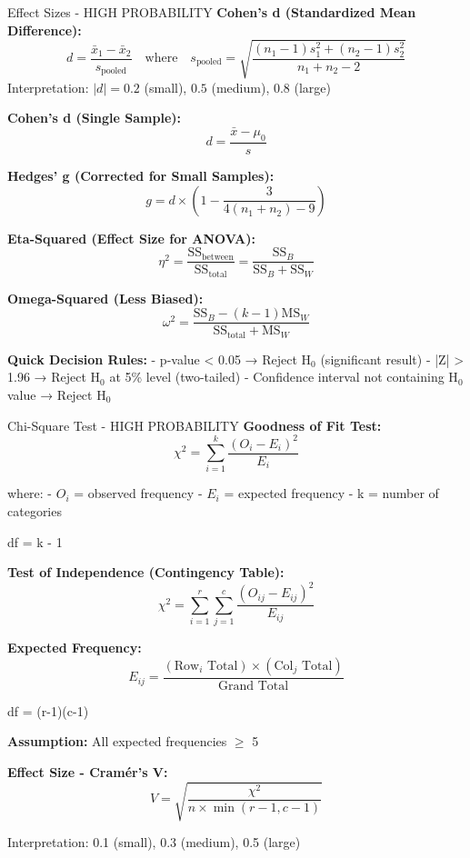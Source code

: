 \documentclass[11pt]{article}
\begin{document}
\begin{important}{Effect Sizes - HIGH PROBABILITY}
\textbf{Cohen's d (Standardized Mean Difference):}
\[d = \frac{\bar{x}_1 - \bar{x}_2}{s_{\text{pooled}}} \quad \text{where} \quad s_{\text{pooled}} = \sqrt{\frac{(n_1-1)s_1^2 + (n_2-1)s_2^2}{n_1+n_2-2}}\]
Interpretation: $|d| = 0.2$ (small), $0.5$ (medium), $0.8$ (large)

\textbf{Cohen's d (Single Sample):}
\[d = \frac{\bar{x} - \mu_0}{s}\]

\textbf{Hedges' g (Corrected for Small Samples):}
\[g = d \times \left(1 - \frac{3}{4(n_1 + n_2) - 9}\right)\]

\textbf{Eta-Squared (Effect Size for ANOVA):}
\[\eta^2 = \frac{\text{SS}_{\text{between}}}{\text{SS}_{\text{total}}} = \frac{\text{SS}_B}{\text{SS}_B + \text{SS}_W}\]

\textbf{Omega-Squared (Less Biased):}
\[\omega^2 = \frac{\text{SS}_B - (k-1)\text{MS}_W}{\text{SS}_{\text{total}} + \text{MS}_W}\]
\end{important}

\begin{example}
\textbf{Quick Decision Rules:}
- p-value < 0.05 → Reject H$_0$ (significant result)
- |Z| > 1.96 → Reject H$_0$ at 5\% level (two-tailed)
- Confidence interval not containing H$_0$ value → Reject H$_0$
\end{example}

\begin{important}{Chi-Square Test - HIGH PROBABILITY}
\textbf{Goodness of Fit Test:}
\[\chi^2 = \sum_{i=1}^{k}\frac{(O_i - E_{i})^2}{E_i}\]

where:
- $O_{i}$ = observed frequency
- $E_{i}$ = expected frequency
- k = number of categories

df = k - 1

\textbf{Test of Independence (Contingency Table):}
\[\chi^2 = \sum_{i=1}^{r}\sum_{j=1}^{c}\frac{(O_{ij} - E_{ij})^2}{E_{ij}}\]

\textbf{Expected Frequency:}
\[E_{ij} = \frac{(\text{Row}_i \text{ Total}) \times (\text{Col}_j \text{ Total})}{\text{Grand Total}}\]

df = (r-1)(c-1)

\textbf{Assumption:} All expected frequencies $\geq$ 5

\textbf{Effect Size - Cramér's V:}
\[V = \sqrt{\frac{\chi^2}{n \times \min(r-1, c-1)}}\]

Interpretation: 0.1 (small), 0.3 (medium), 0.5 (large)
\end{important}
\end{document}
